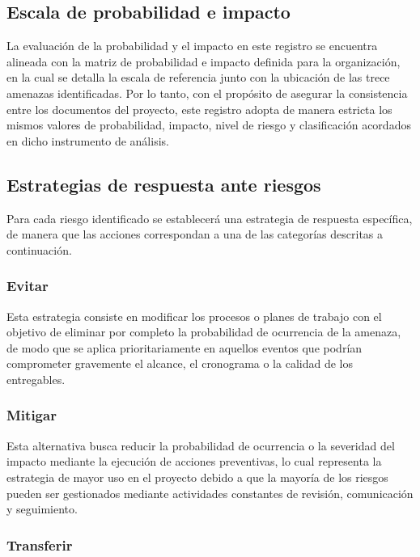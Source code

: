 \documentclass[11pt,spanish]{article}
\begin{document}
\subsection{Escala de probabilidad e impacto}

La evaluación de la probabilidad y el impacto en este registro se encuentra alineada con la matriz de probabilidad e impacto definida para la organización, en la cual se detalla la escala de referencia junto con la ubicación de las trece amenazas identificadas. Por lo tanto, con el propósito de asegurar la consistencia entre los documentos del proyecto, este registro adopta de manera estricta los mismos valores de probabilidad, impacto, nivel de riesgo y clasificación acordados en dicho instrumento de análisis.

\subsection{Estrategias de respuesta ante riesgos}

Para cada riesgo identificado se establecerá una estrategia de respuesta específica, de manera que las acciones correspondan a una de las categorías descritas a continuación.

\subsubsection{Evitar}

Esta estrategia consiste en modificar los procesos o planes de trabajo con el objetivo de eliminar por completo la probabilidad de ocurrencia de la amenaza, de modo que se aplica prioritariamente en aquellos eventos que podrían comprometer gravemente el alcance, el cronograma o la calidad de los entregables.

\subsubsection{Mitigar}

Esta alternativa busca reducir la probabilidad de ocurrencia o la severidad del impacto mediante la ejecución de acciones preventivas, lo cual representa la estrategia de mayor uso en el proyecto debido a que la mayoría de los riesgos pueden ser gestionados mediante actividades constantes de revisión, comunicación y seguimiento.

\subsubsection{Transferir}
\end{document}
